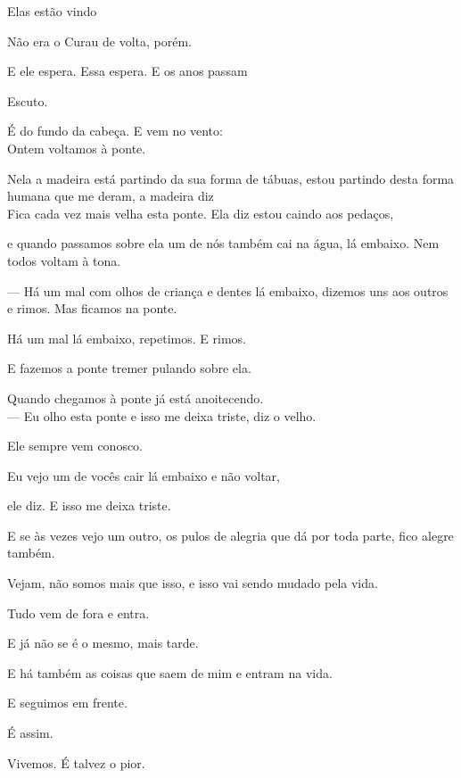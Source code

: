 Elas estão vindo

Não era o Curau de volta, porém.

E ele espera. Essa espera. E os anos passam

\breakk

\clearpage
\thispagestyle{empty}

\movetooddpage

\vspace*{4cm}

Escuto.

É do fundo da cabeça. E vem no vento:\\

Ontem voltamos à ponte.

Nela a madeira está partindo da sua forma de tábuas, estou partindo
desta forma humana que me deram, a madeira diz\\

Fica cada vez mais velha esta ponte. Ela diz estou caindo aos pedaços,

e quando passamos sobre ela um de nós também cai na água, lá embaixo.
Nem todos voltam à tona.

--- Há um mal com olhos de criança e dentes lá embaixo, dizemos uns aos
outros e rimos. Mas ficamos na ponte.

Há um mal lá embaixo, repetimos. E rimos.

E fazemos a ponte tremer pulando sobre ela.

Quando chegamos à ponte já está anoitecendo.\\

--- Eu olho esta ponte e isso me deixa triste, diz o velho.

Ele sempre vem conosco.

Eu vejo um de vocês cair lá embaixo e não voltar,

ele diz. E isso me deixa triste.

E se às vezes vejo um outro, os pulos de alegria que dá por toda parte,
fico alegre também.

Vejam, não somos mais que isso, e isso vai sendo mudado pela vida.

Tudo vem de fora e entra.

E já não se é o mesmo, mais tarde.

E há também as coisas que saem de mim e entram na vida.

E seguimos em frente.

É assim.

Vivemos. É talvez o pior.\\

